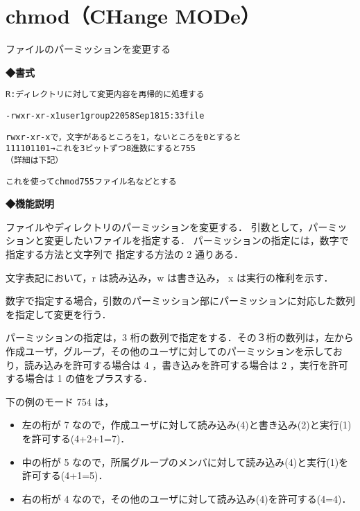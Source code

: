 
\section{chmod（CHange MODe）}
ファイルのパーミッションを変更する\par
\label{cmd:chmod}
\noindent
{\bf ◆書式}
\begin{center}
\begin{screen}
\begin{alltt}
% chmod [-R] パーミッション ファイル名

    R:ディレクトリに対して変更内容を再帰的に処理する

% \underline{ls -l file}  （←fileの詳細な情報を表示する）
-rwxr-xr-x   1 user1   group2  2058 Sep 18 15:33 file

rwxr-xr-x で，文字があるところを1，ないところを0とすると
111101101 → これを3ビットずつ8進数にすると 755
（詳細は下記）

これを使って chmod 755 ファイル名などとする

\end{alltt}
\end{screen}
\end{center}

\noindent
{\bf ◆機能説明}

ファイルやディレクトリのパーミッションを変更する．
引数として，パーミッションと変更したいファイルを指定する．
パーミッションの指定には，数字で指定する方法と文字列で
指定する方法の 2 通りある．\par
文字表記において，r は読み込み，w は書き込み， x は実行の権利を示す．\par
数字で指定する場合，引数のパーミッション部にパーミッションに対応した数列を指定して変更を行う．\par
パーミッションの指定は，3 桁の数列で指定をする．その３桁の数列は，左から作成ユーザ，グループ，その他のユーザに対してのパーミッションを示しており，読み込みを許可する場合は 4 ，書き込みを許可する場合は 2 ，実行を許可する場合は 1 の値をプラスする．\par
下の例のモード 754 は，
\begin{itemize}
\item 左の桁が 7 なので，作成ユーザに対して読み込み(4)と書き込み(2)と実行(1)を許可する(4+2+1=7)．
\item 中の桁が 5 なので，所属グループのメンバに対して読み込み(4)と実行(1)を許可する(4+1=5)．
\item 右の桁が 4 なので，その他のユーザに対して読み込み(4)を許可する(4=4)．
\end{itemize}

